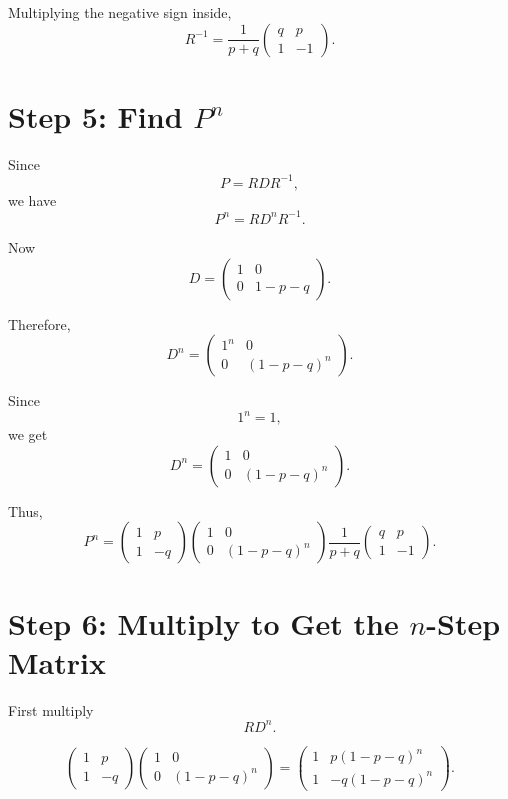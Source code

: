 \documentclass[12pt,a4paper]{article}
\theoremstyle{notestyle}
\begin{document}
Multiplying the negative sign inside,
\[
R^{-1}
=
\frac{1}{p+q}
\begin{pmatrix}
q & p\\
1 & -1
\end{pmatrix}.
\]

\section{Step 5: Find $P^n$}

Since
\[
P=RDR^{-1},
\]
we have
\[
P^n=RD^nR^{-1}.
\]

Now
\[
D=
\begin{pmatrix}
1 & 0\\
0 & 1-p-q
\end{pmatrix}.
\]

Therefore,
\[
D^n=
\begin{pmatrix}
1^n & 0\\
0 & (1-p-q)^n
\end{pmatrix}.
\]

Since
\[
1^n=1,
\]
we get
\[
D^n=
\begin{pmatrix}
1 & 0\\
0 & (1-p-q)^n
\end{pmatrix}.
\]

Thus,
\[
P^n=
\begin{pmatrix}
1 & p\\
1 & -q
\end{pmatrix}
\begin{pmatrix}
1 & 0\\
0 & (1-p-q)^n
\end{pmatrix}
\frac{1}{p+q}
\begin{pmatrix}
q & p\\
1 & -1
\end{pmatrix}.
\]

\section{Step 6: Multiply to Get the $n$-Step Matrix}

First multiply
\[
R D^n.
\]

\[
\begin{pmatrix}
1 & p\\
1 & -q
\end{pmatrix}
\begin{pmatrix}
1 & 0\\
0 & (1-p-q)^n
\end{pmatrix}
=
\begin{pmatrix}
1 & p(1-p-q)^n\\
1 & -q(1-p-q)^n
\end{pmatrix}.
\]
\end{document}
